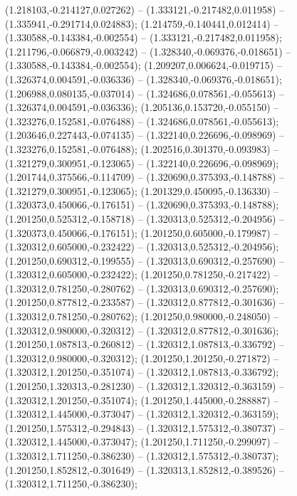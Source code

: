  (1.218103,-0.214127,0.027262) -- (1.333121,-0.217482,0.011958) -- (1.335941,-0.291714,0.024883);
 (1.214759,-0.140441,0.012414) -- (1.330588,-0.143384,-0.002554) -- (1.333121,-0.217482,0.011958);
 (1.211796,-0.066879,-0.003242) -- (1.328340,-0.069376,-0.018651) -- (1.330588,-0.143384,-0.002554);
 (1.209207,0.006624,-0.019715) -- (1.326374,0.004591,-0.036336) -- (1.328340,-0.069376,-0.018651);
 (1.206988,0.080135,-0.037014) -- (1.324686,0.078561,-0.055613) -- (1.326374,0.004591,-0.036336);
 (1.205136,0.153720,-0.055150) -- (1.323276,0.152581,-0.076488) -- (1.324686,0.078561,-0.055613);
 (1.203646,0.227443,-0.074135) -- (1.322140,0.226696,-0.098969) -- (1.323276,0.152581,-0.076488);
 (1.202516,0.301370,-0.093983) -- (1.321279,0.300951,-0.123065) -- (1.322140,0.226696,-0.098969);
 (1.201744,0.375566,-0.114709) -- (1.320690,0.375393,-0.148788) -- (1.321279,0.300951,-0.123065);
 (1.201329,0.450095,-0.136330) -- (1.320373,0.450066,-0.176151) -- (1.320690,0.375393,-0.148788);
 (1.201250,0.525312,-0.158718) -- (1.320313,0.525312,-0.204956) -- (1.320373,0.450066,-0.176151);
 (1.201250,0.605000,-0.179987) -- (1.320312,0.605000,-0.232422) -- (1.320313,0.525312,-0.204956);
 (1.201250,0.690312,-0.199555) -- (1.320313,0.690312,-0.257690) -- (1.320312,0.605000,-0.232422);
 (1.201250,0.781250,-0.217422) -- (1.320312,0.781250,-0.280762) -- (1.320313,0.690312,-0.257690);
 (1.201250,0.877812,-0.233587) -- (1.320312,0.877812,-0.301636) -- (1.320312,0.781250,-0.280762);
 (1.201250,0.980000,-0.248050) -- (1.320312,0.980000,-0.320312) -- (1.320312,0.877812,-0.301636);
 (1.201250,1.087813,-0.260812) -- (1.320312,1.087813,-0.336792) -- (1.320312,0.980000,-0.320312);
 (1.201250,1.201250,-0.271872) -- (1.320312,1.201250,-0.351074) -- (1.320312,1.087813,-0.336792);
 (1.201250,1.320313,-0.281230) -- (1.320312,1.320312,-0.363159) -- (1.320312,1.201250,-0.351074);
 (1.201250,1.445000,-0.288887) -- (1.320312,1.445000,-0.373047) -- (1.320312,1.320312,-0.363159);
 (1.201250,1.575312,-0.294843) -- (1.320312,1.575312,-0.380737) -- (1.320312,1.445000,-0.373047);
 (1.201250,1.711250,-0.299097) -- (1.320312,1.711250,-0.386230) -- (1.320312,1.575312,-0.380737);
 (1.201250,1.852812,-0.301649) -- (1.320313,1.852812,-0.389526) -- (1.320312,1.711250,-0.386230);
